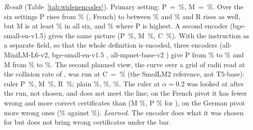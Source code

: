 \emph{Result} (Table~\ref{tab:widenencoder}). Primary setting: \textsf{P}~=~\WidenEncPrimP{}\%, \textsf{M}~=~\WidenEncPrimM{}\%. Over the six settings \textsf{P} rises from \WidenRefTfiveFrP{}\% (\cert{}, French) to between \WidenEncRulerTwentyFrP{}\% and \WidenEncPlainTenFrP{}\% and \textsf{R} rises as well, but \textsf{M} is at least \WidenEncRulerTwentyFrM{}\% in all six, and \WidenEncPlainTenFrM{}\% where \textsf{P} is highest. A second encoder (bge-small-en-v1.5) gives the same picture (\textsf{P}~\WidenBgeP{}\%, \textsf{M}~\WidenBgeM{}\%, \textsf{C}~\WidenBgeC{}\%). With the instruction as a separate field, so that the whole definition is encoded, three encoders (all-MiniLM-L6-v2, bge-small-en-v1.5 \citep{xiao2023cpack}, all-mpnet-base-v2 \citep{song2020mpnet}) give \textsf{P} from \WidenFieldPLow{}\% to \WidenFieldPHigh{}\% and \textsf{M} from \WidenFieldMLow{}\% to \WidenFieldMHigh{}\%. The second planned view, the curve over a grid of radii read at the collision rate of \cert{}, was run at \textsf{C}~=~\WidenEncCurveC{}\% (the SmolLM2 reference, not T5-base): ruler \textsf{P}~\WidenEncCurveRulerP{}\%, \textsf{M}~\WidenEncCurveRulerM{}\%, \textsf{R}~\WidenEncCurveRulerR{}\%; plain \WidenEncCurvePlainP{}\%, \WidenEncCurvePlainM{}\%, \WidenEncCurvePlainR{}\%. The ruler at $\alpha = 0.2$ was looked at after the run, not chosen, and does not meet the line; on the French pivot it has fewer wrong and more correct certificates than \cert{} (\textsf{M} \WidenRefTfiveFrM{}\%, \textsf{P} \WidenRefTfiveFrP{}\% for \cert{}), on the German pivot more wrong ones (\WidenEncRulerTwentyDeM{}\% against \WidenRefTfiveDeM{}\%).
\emph{Learned.} The encoder does what it was chosen for but does not bring wrong certificates under the bar.

\begin{table}[t]
  \caption{The six settings of the sentence encoder (plain metric or paraphrase ruler; $\alpha = 0.05, 0.1, 0.2$) on the French and German pivot, \WidenParaInputsPivot{} paraphrased inputs each, \WidenTasksEval{} evaluation tasks, in \%. Primary setting in bold. \textsf{C} and \textsf{U} do not depend on the pivot. \textsf{Z} is to be compared with $1 - \alpha$. The radius was set on German-pivot paraphrases of other tasks.}
  \label{tab:widenencoder}
  \centering
  \footnotesize
  \setlength{\tabcolsep}{4pt}
  
\end{table}

